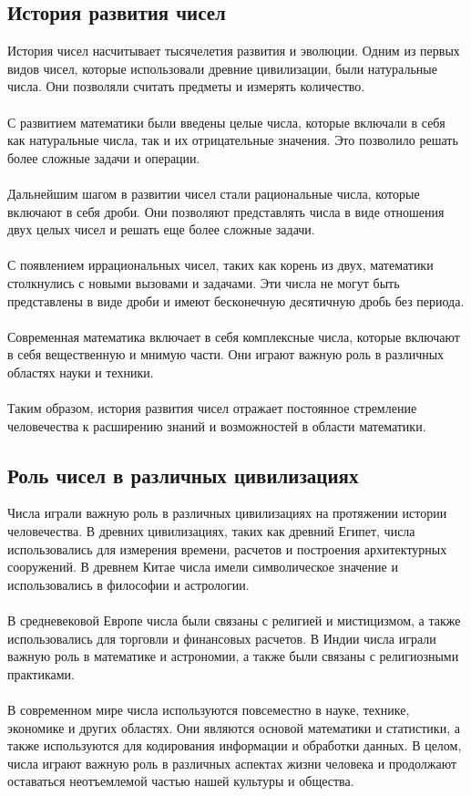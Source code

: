\documentclass{article}
\begin{document}
\subsection{История развития чисел}
История чисел насчитывает тысячелетия развития и эволюции. Одним из первых видов чисел, которые использовали древние цивилизации, были натуральные числа. Они позволяли считать предметы и измерять количество.\\
~\\
С развитием математики были введены целые числа, которые включали в себя как натуральные числа, так и их отрицательные значения. Это позволило решать более сложные задачи и операции.\\
~\\
Дальнейшим шагом в развитии чисел стали рациональные числа, которые включают в себя дроби. Они позволяют представлять числа в виде отношения двух целых чисел и решать еще более сложные задачи.\\
~\\
С появлением иррациональных чисел, таких как корень из двух, математики столкнулись с новыми вызовами и задачами. Эти числа не могут быть представлены в виде дроби и имеют бесконечную десятичную дробь без периода.\\
~\\
Современная математика включает в себя комплексные числа, которые включают в себя вещественную и мнимую части. Они играют важную роль в различных областях науки и техники.\\
~\\
Таким образом, история развития чисел отражает постоянное стремление человечества к расширению знаний и возможностей в области математики.
\subsection{Роль чисел в различных цивилизациях}
Числа играли важную роль в различных цивилизациях на протяжении истории человечества. В древних цивилизациях, таких как древний Египет, числа использовались для измерения времени, расчетов и построения архитектурных сооружений. В древнем Китае числа имели символическое значение и использовались в философии и астрологии.\\
~\\
В средневековой Европе числа были связаны с религией и мистицизмом, а также использовались для торговли и финансовых расчетов. В Индии числа играли важную роль в математике и астрономии, а также были связаны с религиозными практиками.\\
~\\
В современном мире числа используются повсеместно в науке, технике, экономике и других областях. Они являются основой математики и статистики, а также используются для кодирования информации и обработки данных. В целом, числа играют важную роль в различных аспектах жизни человека и продолжают оставаться неотъемлемой частью нашей культуры и общества.
\end{document}
